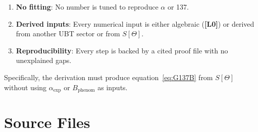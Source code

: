 \documentclass[12pt,a4paper]{article}
\theoremstyle{definition}
\theoremstyle{remark}
\newcommand{\Lzero}{\textbf{[L0]}}
\begin{document}
\begin{enumerate}
  \item \textbf{No fitting}: No number is tuned to reproduce $\alpha$ or 137.
  \item \textbf{Derived inputs}: Every numerical input is either algebraic
    (\Lzero) or derived from another UBT sector or from $S[\Theta]$.
  \item \textbf{Reproducibility}: Every step is backed by a cited proof file
    with no unexplained gaps.
\end{enumerate}

Specifically, the derivation must produce equation~\eqref{eq:G137B} from
$S[\Theta]$ without using $\alpha_{\mathrm{exp}}$ or $B_{\mathrm{phenom}}$
as inputs.

\section{Source Files}
\label{sec:sources}
\end{document}
